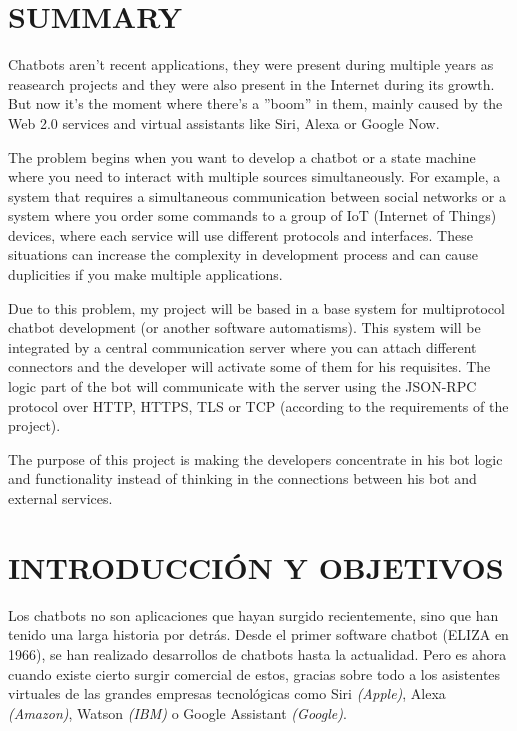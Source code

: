 \documentclass[spanish,12pt, a4paper, twoside]{paper}
\let\oldsection\section
\def\section{\cleardoublepage\oldsection}
\begin{document}
\section*{SUMMARY}
Chatbots aren't recent applications, they were present during multiple years as reasearch projects and they were also present in the Internet during its growth. But now it's the moment where there's a ''boom'' in them, mainly caused by the Web 2.0 services and virtual assistants like Siri, Alexa or Google Now.
\newline

The problem begins when you want to develop a chatbot or a state machine where you need to interact with multiple sources simultaneously. For example, a system that requires a simultaneous communication between social networks or a system where you order some commands to a group of IoT (Internet of Things) devices, where each service will use different protocols and interfaces. These situations can increase the complexity in development process and can cause duplicities if you make multiple applications. 
\newline

Due to this problem, my project will be based in a base system for multiprotocol chatbot development (or another software automatisms). This system will be integrated by a central communication server where you can attach different connectors and the developer will activate some of them for his requisites. The logic part of the bot will communicate with the server using the JSON-RPC protocol over HTTP, HTTPS, TLS or TCP (according to the requirements of the project).
\newline

The purpose of this project is making the developers concentrate in his bot logic and functionality instead of thinking in the connections between his bot and external services.

\tableofcontents %

\listoffigures
\listoftables

\newpage
{} 

\section{INTRODUCCIÓN Y OBJETIVOS}

Los chatbots no son aplicaciones que hayan surgido recientemente, sino que han tenido una larga historia por detrás. Desde el primer software chatbot (ELIZA en 1966), se han realizado desarrollos de chatbots hasta la actualidad. Pero es ahora cuando existe cierto surgir comercial de estos, gracias sobre todo a los asistentes virtuales de las grandes empresas tecnológicas como Siri \emph{(Apple)}, Alexa \emph{(Amazon)}, Watson \emph{(IBM)} o Google Assistant \emph{(Google)}.
\newline
\end{document}
